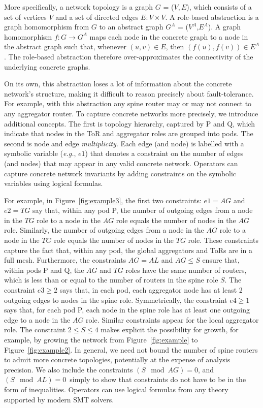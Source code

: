 \documentclass[numbers, 10pt, preprint]{sigplanconf}
\newcommand{\EG}{\emph{e.g.}}
\begin{document}
More specifically, a network topology is a graph $G$ = ($V, E$), which consists of a set of vertices $V$ and a set of directed edges $E \colon V \times V$. A role-based abstraction is a graph homomorphism from $G$ to an abstract graph $G^A$ = ($V^A$,$E^A$). A graph homomorphism $f : G \rightarrow G^A$ maps each node in the concrete graph to a node in the abstract graph such that, whenever $(u,v) \in E$, then $(f(u),f(v)) \in E^A$. The role-based abstraction therefore over-approximates the connectivity of the underlying concrete graphs.

On its own, this abstraction loses a lot of information about the concrete network's structure, making it difficult to reason precisely about fault-tolerance.
For example, with this abstraction any spine router may or may not connect to any aggregator router.
%
To capture concrete networks more precisely,
we introduce additional concepts. The first is topology hierarchy, captured by P and Q, which indicate that nodes in the ToR and aggregator roles are grouped into pods.
The second is node and edge \emph{multiplicity}. Each edge (and node) is labelled
with a symbolic variable (\EG, $e1$) that denotes a constraint on the number of edges (and nodes) that may appear in any valid concrete network. Operators can capture concrete network invariants by adding constraints on the symbolic variables using logical formulas.

For example, in Figure~\ref{fig:example3}, the first two constraints: $e1 = AG$ and $e2 = TG$ say that, within any pod P, the number of outgoing edges from a node in the $TG$ role to a node in the $AG$ role equals the number of nodes in the $AG$ role. Similarly, the number of outgoing edges from a node in the $AG$ role to a node in the $TG$ role equals the number of nodes in the $TG$ role. These constraints capture the fact that, within any pod, the global aggregators and ToRs are in a full mesh. Furthermore, the constraints $AG = AL$ and $AG \leq S$ ensure that, within pods P and Q, the $AG$ and $TG$ roles have the same number of routers, which is less than or equal to the number of routers in the spine role $S$.
%
The constraint $e3 \geq 2$ says that, in each pod, each aggregator node has at least 2 outgoing edges to nodes in the spine role. Symmetrically, the constraint $e4 \geq 1$ says that, for each pod P, each node in the spine role has at least one outgoing edge to a node in the $AG$ role. Similar constraints appear for the local aggregator role. The constraint $2 \leq S \leq 4$ makes explicit the possibility for growth, for example, by growing the network from Figure~\ref{fig:example} to Figure~\ref{fig:example2}. In general, we need not bound the number of spine routers to admit more concrete topologies, potentially at the expense of analysis precision. We also include the constraints $(S \mod AG) = 0$, and $(S \mod AL) = 0$~simply to show that constraints do not have to be in the form of inequalities. Operators can use logical formulas from any theory supported by modern SMT solvers.
\end{document}
